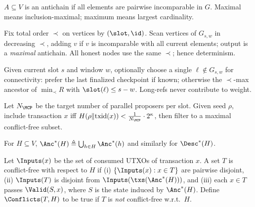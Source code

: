 \begin{definition}
$A\subseteq V$ is an antichain if all elements are pairwise incomparable in $G$. Maximal means inclusion-maximal; maximum means largest cardinality.
\end{definition}
\begin{definition}[\GreedyAntichain\ on $G_{s,w}$]
Fix total order $\prec$ on vertices by $(\slot,\id)$. Scan vertices of $G_{s,w}$ in decreasing $\prec$, adding $v$ if $v$ is incomparable with all current elements; output is a \emph{maximal} antichain. All honest nodes use the same $\prec$; hence determinism.
\end{definition}
\begin{definition}[\OptionalLongRef]
Given current slot $s$ and window $w$, optionally choose a single $\ell\notin G_{s,w}$ for connectivity: prefer the last finalized checkpoint if known; otherwise the $\prec$-max ancestor of $\min_{\prec}R$ with $\slot(\ell)\le s-w$. Long-refs never contribute to weight.
\end{definition}
\begin{definition}[\SampleMempool]
Let $N_{\MCP}$ be the target number of parallel proposers per slot. Given seed $\rho$, include transaction $x$ iff 
$H(\rho\|\mathrm{txid}(x))<\tfrac{1}{N_{\MCP}}\cdot 2^\kappa$, then filter to a maximal conflict-free subset.
\end{definition}
\begin{definition}
For $H\subseteq V$, $\Anc^*(H)\triangleq \bigcup_{h\in H}\Anc^*(h)$ and similarly for $\Desc^*(H)$.
\end{definition}
\begin{definition}
Let $\Inputs(x)$ be the set of consumed UTXOs of transaction $x$. A set $T$ is conflict-free with respect to $H$ if (i) $\{\Inputs(x):x\in T\}$ are pairwise disjoint,
(ii) $\Inputs(T)$ is disjoint from $\Inputs(\txs(\Anc^*(H)))$, and (iii) each $x\in T$ passes $\Valid(S,x)$, where $S$ is the state induced by $\Anc^*(H)$. Define $\Conflicts(T,H)$ to be true if $T$ is \emph{not} conflict-free w.r.t.\ $H$.
\end{definition}


